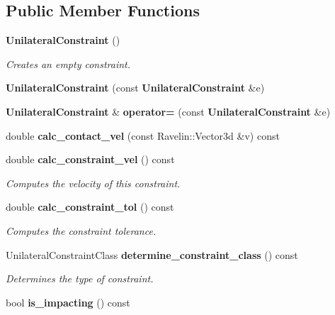 \subsection*{Public Member Functions}
\begin{DoxyCompactItemize}
\item 
{\bf Unilateral\-Constraint} ()\label{classMoby_1_1UnilateralConstraint_ac5bdd4c35cab00d08374f03127821a3d}

\begin{DoxyCompactList}\small\item\em Creates an empty constraint. \end{DoxyCompactList}\item 
{\bfseries Unilateral\-Constraint} (const {\bf Unilateral\-Constraint} \&e)\label{classMoby_1_1UnilateralConstraint_a0fbf8fa92a76aa7ff3b6a5169831ba90}

\item 
{\bf Unilateral\-Constraint} \& {\bfseries operator=} (const {\bf Unilateral\-Constraint} \&e)\label{classMoby_1_1UnilateralConstraint_a672e61327001836e2e519073562bb03e}

\item 
double {\bfseries calc\-\_\-contact\-\_\-vel} (const Ravelin\-::\-Vector3d \&v) const \label{classMoby_1_1UnilateralConstraint_af7c5c48ec183ec43d5bb209a2f0a53cd}

\item 
double {\bf calc\-\_\-constraint\-\_\-vel} () const 
\begin{DoxyCompactList}\small\item\em Computes the velocity of this constraint. \end{DoxyCompactList}\item 
double {\bf calc\-\_\-constraint\-\_\-tol} () const 
\begin{DoxyCompactList}\small\item\em Computes the constraint tolerance. \end{DoxyCompactList}\item 
Unilateral\-Constraint\-Class {\bf determine\-\_\-constraint\-\_\-class} () const \label{classMoby_1_1UnilateralConstraint_a9ccb26d4f4947778e30d000991b3f9a9}

\begin{DoxyCompactList}\small\item\em Determines the type of constraint. \end{DoxyCompactList}\item 
bool {\bfseries is\-\_\-impacting} () const \label{classMoby_1_1UnilateralConstraint_acdc46a255696c475f37d4a89f4ed48e5}


\end{DoxyCompactItemize}
